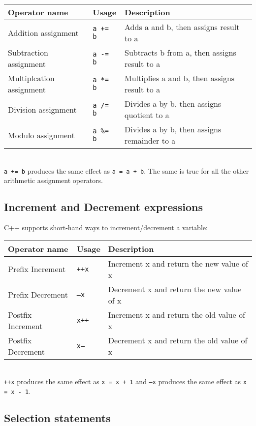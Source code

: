 \documentclass[a4paper,12pt]{article}
\begin{document}
\begin{tabular}{|l|l|l|}
\hline
Operator name & Usage & Description \\
\hline
Addition assignment & \texttt{a += b} & Adds a and b, then assigns result to a \\
\hline
Subtraction assignment & \texttt{a -= b} & Subtracts b from a, then assigns result to a \\
\hline
Multiplcation assignment & \texttt{a *= b} & Multiplies a and b, then assigns result to a \\
\hline
Division assignment & \texttt{a /= b} & Divides a by b, then assigns quotient to a \\
\hline
Modulo assignment & \texttt{a \%= b} & Divides a by b, then assigns remainder to a \\
\hline
\end{tabular} \\

\texttt{a += b} produces the same effect as \texttt{a = a + b}. The same is true for all the other arithmetic assignment operators.

\subsection*{Increment and Decrement expressions}

C++ supports short-hand ways to increment/decrement a variable: \\

\begin{tabular}{|l|l|l|}
\hline
Operator name & Usage & Description \\
\hline
Prefix Increment & \texttt{++x} & Increment x and return the new value of x \\
\hline
Prefix Decrement & \texttt{--x} & Decrement x and return the new value of x \\
\hline
Postfix Increment & \texttt{x++} & Increment x and return the old value of x \\
\hline
Postfix Decrement & \texttt{x--} & Decrement x and return the old value of x \\
\hline
\end{tabular} \\

\texttt{++x} produces the same effect as \texttt{x = x + 1} and \texttt{--x} produces the same effect as \texttt{x = x - 1}.

\subsection*{Selection statements}
\end{document}
